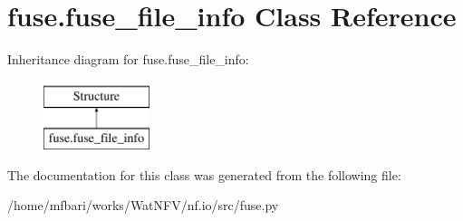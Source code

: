 \hypertarget{classfuse_1_1fuse__file__info}{\section{fuse.\-fuse\-\_\-file\-\_\-info Class Reference}
\label{classfuse_1_1fuse__file__info}
}
Inheritance diagram for fuse.\-fuse\-\_\-file\-\_\-info\-:\begin{figure}[H]
\begin{center}
\leavevmode
\includegraphics[height=2.000000cm]{classfuse_1_1fuse__file__info}
\end{center}
\end{figure}


The documentation for this class was generated from the following file\-:\begin{DoxyCompactItemize}
\item 
/home/mfbari/works/\-Wat\-N\-F\-V/nf.\-io/src/fuse.\-py\end{DoxyCompactItemize}
